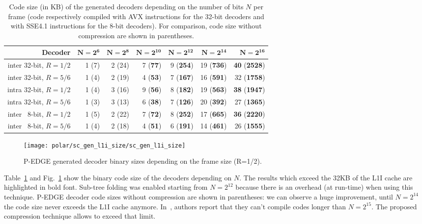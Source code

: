 \begin{table}[htp]
  \begin{center}
  \begin{tabular}{r r r r r r r}
    \textbf{Decoder}         & $\bm{N = 2^6}$ & $\bm{N = 2^8}$ & $\bm{N = 2^{10}}$ & $\bm{N = 2^{12}}$ & $\bm{N = 2^{14}}$ & $\bm{N = 2^{16}}$           \\
    \hline
    \hline
    inter 32-bit, $R = 1/2$  & 1 (7)          & 2 (24)         & 7 (\textbf{77})   & 9 (\textbf{254})  & 19 (\textbf{736}) & \textbf{40} (\textbf{2528}) \\
    inter 32-bit, $R = 5/6$  & 1 (4)          & 2 (19)         & 4 (\textbf{53})   & 7 (\textbf{167})  & 16 (\textbf{591}) & 32          (\textbf{1758}) \\
    intra 32-bit, $R = 1/2$  & 1 (4)          & 3 (16)         & 9 (\textbf{56})   & 8 (\textbf{182})  & 19 (\textbf{563}) & \textbf{38} (\textbf{1947}) \\
    intra 32-bit, $R = 5/6$  & 1 (3)          & 3 (13)         & 6 (\textbf{38})   & 7 (\textbf{126})  & 20 (\textbf{392}) & 27          (\textbf{1365}) \\
    inter ~8-bit, $R = 1/2$  & 1 (5)          & 2 (22)         & 7 (\textbf{72})   & 8 (\textbf{252})  & 17 (\textbf{665}) & \textbf{36} (\textbf{2220}) \\
    inter ~8-bit, $R = 5/6$  & 1 (4)          & 2 (18)         & 4 (\textbf{51})   & 6 (\textbf{191})  & 14 (\textbf{461}) & 26          (\textbf{1555}) \\
  \end{tabular}
  \end{center}
  \caption{Code size (in KB) of the generated decoders depending on the number
    of bits $N$ per frame (code respectively compiled with AVX instructions for
    the 32-bit decoders and with SSE4.1 instructions for the 8-bit decoders).
    For comparison, code size without compression are shown in parentheses.}
  \label{tab:eval_polar_sc_gen_l1i_size}
\end{table}

\begin{figure}[htp]
  \texttt{[image: polar/sc\_gen\_l1i\_size/sc\_gen\_l1i\_size]}
  \caption{P-EDGE generated decoder binary sizes depending on the frame size
    (R=1/2).}
  \label{plot:eval_polar_sc_gen_l1i_size}
\end{figure}

Table~\ref{tab:eval_polar_sc_gen_l1i_size} and
Fig.~\ref{plot:eval_polar_sc_gen_l1i_size} show the binary code size of the
decoders depending on $N$. The results which exceed the 32KB of the L1I cache
are highlighted in bold font. Sub-tree folding was enabled starting from
$N=2^{12}$ because there is an overhead (at run-time) when using this technique.
P-EDGE decoder code sizes without compression are shown in parentheses: we can
observe a huge improvement, until $N=2^{14}$ the code size never exceeds the L1I
cache anymore. In~\cite{Giard2016b}, authors report that they can't compile
codes longer than $N = 2^{15}$. The proposed compression technique allows to
exceed that limit.

